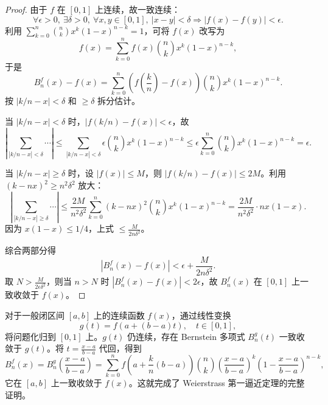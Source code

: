 \begin{proof}
由于 $f$ 在 $[0,1]$ 上连续，故一致连续：
\[
\forall \epsilon>0,\ \exists\delta>0,\ \forall x,y\in[0,1],\ |x-y|<\delta \Rightarrow |f(x)-f(y)|<\epsilon.
\]
利用 $\sum_{k=0}^{n} \binom{n}{k} x^k (1-x)^{n-k} = 1$，可将 $f(x)$ 改写为
\[
f(x) = \sum_{k=0}^{n} f(x) \binom{n}{k} x^k (1-x)^{n-k},
\]
于是
\[
B_n^f(x)-f(x) = \sum_{k=0}^{n} \left(f\left(\frac{k}{n}\right)-f(x)\right) \binom{n}{k} x^k (1-x)^{n-k}.
\]
按 $|k/n-x|<\delta$ 和 $\ge\delta$ 拆分估计。

当 $|k/n-x|<\delta$ 时，$|f(k/n)-f(x)|<\epsilon$，故
\[
\left|\sum_{|k/n-x|<\delta} \cdots \right|
\le \sum_{|k/n-x|<\delta} \epsilon \binom{n}{k} x^k (1-x)^{n-k}
\le \epsilon \sum_{k=0}^{n} \binom{n}{k} x^k (1-x)^{n-k} = \epsilon.
\]

当 $|k/n-x|\ge\delta$ 时，设 $|f(x)|\le M$，则 $|f(k/n)-f(x)|\le 2M$。利用 $(k-nx)^2 \ge n^2\delta^2$ 放大：
\[
\left|\sum_{|k/n-x|\ge\delta} \cdots \right|
\le \frac{2M}{n^2\delta^2} \sum_{k=0}^{n} (k-nx)^2 \binom{n}{k} x^k (1-x)^{n-k}
= \frac{2M}{n^2\delta^2}\cdot nx(1-x).
\]
因为 $x(1-x)\le 1/4$，上式 $\le \frac{M}{2n\delta^2}$。

综合两部分得
\[
|B_n^f(x)-f(x)| < \epsilon + \frac{M}{2n\delta^2}.
\]
取 $N > \frac{M}{2\epsilon\delta^2}$，则当 $n>N$ 时 $|B_n^f(x)-f(x)| < 2\epsilon$，故 $B_n^f(x)$ 在 $[0,1]$ 上一致收敛于 $f(x)$。
\end{proof}

对于一般闭区间 $[a,b]$ 上的连续函数 $f(x)$，通过线性变换
\[
g(t) = f(a+(b-a)t),\quad t\in[0,1],
\]
将问题化归到 $[0,1]$ 上。$g(t)$ 仍连续，存在 Bernstein 多项式 $B_n^g(t)$ 一致收敛于 $g(t)$。将 $t=\frac{x-a}{b-a}$ 代回，得到
\[
B_n^f(x) = B_n^g\!\left( \frac{x-a}{b-a} \right)
= \sum_{k=0}^{n} f\!\left( a+\frac{k}{n}(b-a) \right)
\binom{n}{k} \left( \frac{x-a}{b-a} \right)^{\!k}
\left( 1-\frac{x-a}{b-a} \right)^{\!n-k},
\]
它在 $[a,b]$ 上一致收敛于 $f(x)$。这就完成了 Weierstrass 第一逼近定理的完整证明。
